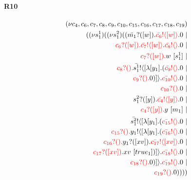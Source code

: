 \documentclass{article}
\begin{document}
\paragraph{R10}
\begin{align*}
 (\nu c_{4},c_{6},c_{7},c_{8},c_{9},c_{10},c_{15},c_{16},c_{17},c_{18},c_{19}) \\ ( (\nu s^{1}_{1})( (\nu s^{2}_{1})((\color{black}\bar{m_{1}}?([w]).\color{black}\color{red}\bar{c_{6}}! \langle [w] \rangle \color{black}.0  \ | \\ \color{red}c_{6}?([w]).\color{black}\color{red}\bar{c_{7}}! \langle [w] \rangle \color{black}.\color{red}\bar{c_{8}}! \langle  \rangle \color{black}.0  \ | \\ \color{red}c_{7}?([w]).\color{black}w \ [s^{1}_{1}] \ | \\ \color{red}c_{8}?().\color{black}\color{black}\bar{s^{1}_{1}}! \langle [ \lambda [y_{1}].(\color{red}\bar{c_{9}}! \langle  \rangle \color{black}.0  \ | \\ \color{red}c_{9}?().\color{black}0 )] \rangle \color{black}.\color{red}\bar{c_{10}}! \langle  \rangle \color{black}.0  \ | \\ \color{red}c_{10}?().\color{black}0  \ | \\ \color{black}s^{2}_{1}?([y]).\color{black}\color{red}\bar{c_{4}}! \langle [y] \rangle \color{black}.0  \ | \\ \color{red}c_{4}?([y]).\color{black}y \ [m_{1}] \ | \\ \color{black}\bar{s^{2}_{1}}! \langle [ \lambda [y_{1}].(\color{red}\bar{c_{15}}! \langle  \rangle \color{black}.0  \ | \\ \color{red}c_{15}?().\color{black}\color{black}y_{1}! \langle [ \lambda [y_{1}].(\color{red}\bar{c_{16}}! \langle  \rangle \color{black}.0  \ | \\ \color{red}c_{16}?().\color{black}\color{black}y_{1}?([xv]).\color{black}\color{red}\bar{c_{17}}! \langle [xv] \rangle \color{black}.0  \ | \\ \color{red}c_{17}?([xv]).\color{black}xv \ [true_{1}])] \rangle \color{black}.\color{red}\bar{c_{18}}! \langle  \rangle \color{black}.0  \ | \\ \color{red}c_{18}?().\color{black}0 )] \rangle \color{black}.\color{red}\bar{c_{19}}! \langle  \rangle \color{black}.0  \ | \\ \color{red}c_{19}?().\color{black}0 ))))
\end{align*}
\end{document}
